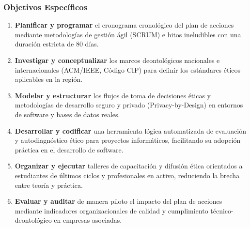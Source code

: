 \documentclass[12pt,a4paper]{article}
\begin{document}
\subsubsection{Objetivos Específicos}
\begin{enumerate}
    \item \textbf{Planificar y programar} el cronograma cronológico del plan de acciones mediante metodologías de gestión ágil (SCRUM) e hitos ineludibles con una duración estricta de 80 días.
    \item \textbf{Investigar y conceptualizar} los marcos deontológicos nacionales e internacionales (ACM/IEEE, Código CIP) para definir los estándares éticos aplicables en la región.
    \item \textbf{Modelar y estructurar} los flujos de toma de decisiones éticas y metodologías de desarrollo seguro y privado (Privacy-by-Design) en entornos de software y bases de datos reales.
    \item \textbf{Desarrollar y codificar} una herramienta lógica automatizada de evaluación y autodiagnóstico ético para proyectos informáticos, facilitando su adopción práctica en el desarrollo de software.
    \item \textbf{Organizar y ejecutar} talleres de capacitación y difusión ética orientados a estudiantes de últimos ciclos y profesionales en activo, reduciendo la brecha entre teoría y práctica.
    \item \textbf{Evaluar y auditar} de manera piloto el impacto del plan de acciones mediante indicadores organizacionales de calidad y cumplimiento técnico-deontológico en empresas asociadas.
\end{enumerate}
\end{document}
